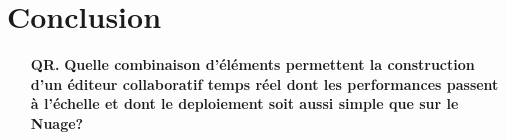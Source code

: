 
\section{Conclusion}
\label{editor:sec:conclusion}


\begin{itemize}
\item [\textbf{QR.}] \textbf{Quelle combinaison d'éléments permettent la construction
  d'un éditeur collaboratif temps réel dont les performances passent à l'échelle
  et dont le deploiement soit aussi simple que sur le Nuage?}
\end{itemize}
